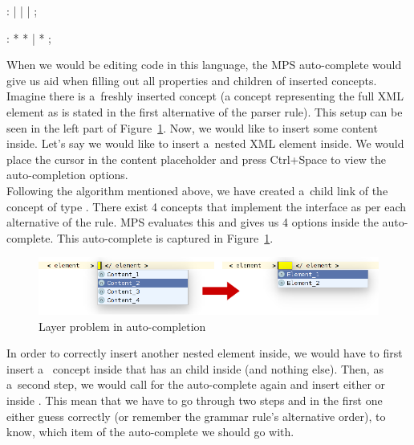 \begin{antlr}
	    :   
           |   
           |   
           |   
           ;

	    :   \literal{<}  * \literal{>} * \literal{</}  \literal{>}
           |   \literal{<}  * \literal{/>}
           ;
\end{antlr}

When we would be editing code in this language, the MPS auto-complete would give us aid when filling out all properties and children of inserted concepts.
Imagine there is a~freshly inserted  concept (a concept representing the full XML element as is stated in the first alternative of the  parser rule).
This setup can be seen in the left part of Figure~\ref{fig:layer_problem}.
Now, we would like to insert some content inside.
Let's say we would like to insert a~nested XML element inside.
We would place the cursor in the content placeholder and press Ctrl+Space to view the auto-completion options.
\\

Following the algorithm mentioned above, we have created a~child link of the  concept of type .
There exist 4 concepts that implement the  interface as per each alternative of the rule.
MPS evaluates this and gives us 4 options inside the auto-complete.
This auto-complete is captured in Figure~\ref{fig:layer_problem}.

\begin{figure}[ht]
	\centering
	\includegraphics[width=\textwidth]{./img/layer_problem.png}
	\caption{Layer problem in auto-completion}
	\label{fig:layer_problem}
\end{figure}

In order to correctly insert another nested element inside, we would have to first insert a~ concept inside  that has an  child inside (and nothing else).
Then, as a~second step, we would call for the auto-complete again and insert either  or  inside .
This mean that we have to go through two steps and in the first one either guess correctly (or remember the grammar rule's alternative order), to know, which item of the auto-complete we should go with.
\\

